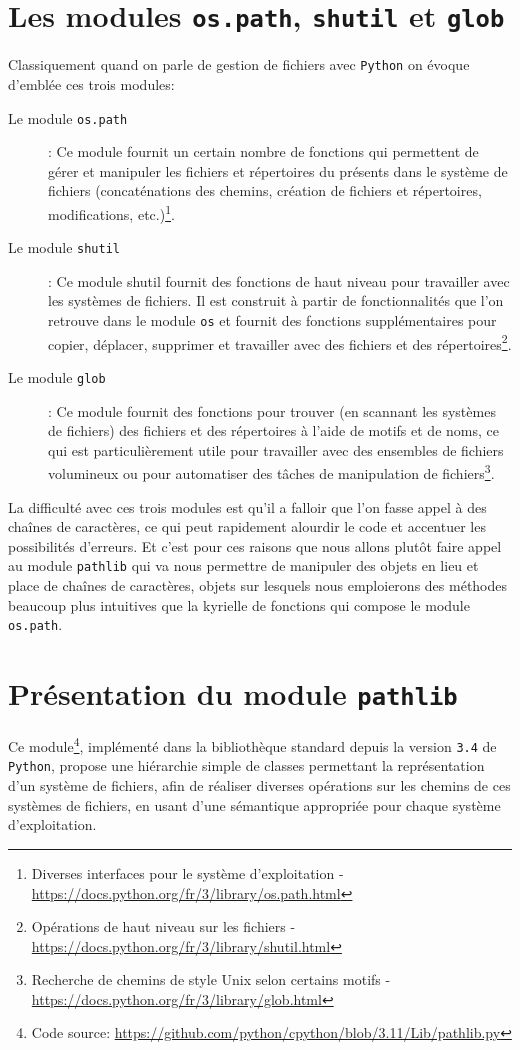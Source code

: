 \documentclass[a4paper,12pt]{book}
\begin{document}
\section{Les modules \texttt{os.path}, \texttt{shutil} et \texttt{glob}}
Classiquement quand on parle de gestion de fichiers avec \texttt{Python} on évoque d'emblée ces trois modules:
\begin{description}
	\item[Le module \texttt{os.path}]: Ce module fournit un certain nombre de fonctions qui permettent de gérer et manipuler les fichiers et répertoires du présents dans le système de fichiers (concaténations des chemins, création de fichiers et répertoires, modifications, etc.)\footnote{Diverses interfaces pour le système d'exploitation - \url{https://docs.python.org/fr/3/library/os.path.html}}.
	\item[Le module \texttt{shutil}]: Ce module shutil fournit des fonctions de haut niveau pour travailler avec les systèmes de fichiers. Il est construit à partir de fonctionnalités que l'on retrouve dans le module \texttt{os} et fournit des fonctions supplémentaires pour copier, déplacer, supprimer et travailler avec des fichiers et des répertoires\footnote{Opérations de haut niveau sur les fichiers - \url{https://docs.python.org/fr/3/library/shutil.html}}.
	\item[Le module \texttt{glob}]: Ce module fournit des fonctions pour trouver (en scannant les systèmes de fichiers) des fichiers et des répertoires à l'aide de  motifs et de noms, ce qui est particulièrement utile pour travailler avec des ensembles de fichiers volumineux ou pour automatiser des tâches de manipulation de fichiers\footnote{Recherche de chemins de style Unix selon certains motifs - \url{https://docs.python.org/fr/3/library/glob.html}}.
\end{description}
\medskip

La difficulté avec ces trois modules est qu'il a falloir que l'on fasse appel à des chaînes de caractères, ce qui peut rapidement alourdir le code et accentuer les possibilités d'erreurs. Et c'est pour ces raisons que nous allons plutôt faire appel au module \texttt{pathlib} qui va nous permettre de manipuler des objets en lieu et place de chaînes de caractères, objets sur lesquels nous emploierons des méthodes beaucoup plus intuitives que la kyrielle de fonctions qui compose le module \texttt{os.path}. 
\medskip

\section{Présentation du module \texttt{pathlib}}
Ce module\footnote{Code source: \url{https://github.com/python/cpython/blob/3.11/Lib/pathlib.py}}, implémenté dans la bibliothèque standard depuis la version \texttt{3.4} de \texttt{Python}, propose une hiérarchie simple de classes permettant la représentation d'un système de fichiers, afin de réaliser diverses opérations sur les chemins de ces systèmes de fichiers, en usant d'une sémantique appropriée pour chaque système d'exploitation.
\medskip
\end{document}
